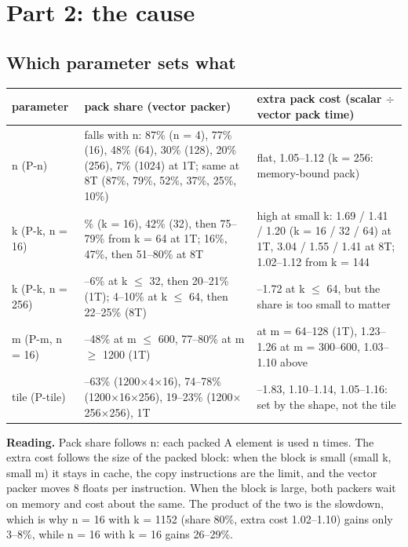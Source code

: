\documentclass[10pt,a4paper]{article}
\begin{document}
\section*{Part 2: the cause}
\subsection*{Which parameter sets what}
\begin{tabularx}{\textwidth}{@{}l >{\raggedright\arraybackslash}X >{\raggedright\arraybackslash}X@{}}
\toprule
parameter & pack share (vector packer) & extra pack cost (scalar $\div$ vector pack time) \\
\midrule
n (P-n) & falls with n: 87\% (n = 4), 77\% (16), 48\% (64), 30\% (128), 20\% (256), 7\% (1024) at 1T; same at 8T (87\%, 79\%, 52\%, 37\%, 25\%, 10\%) & flat, 1.05--1.12 (k = 256: memory-bound pack) \\
k (P-k, n = 16) & 31\% (k = 16), 42\% (32), then 75--79\% from k = 64 at 1T; 16\%, 47\%, then 51--80\% at 8T & high at small k: 1.69 / 1.41 / 1.20 (k = 16 / 32 / 64) at 1T, 3.04 / 1.55 / 1.41 at 8T; 1.02--1.12 from k = 144 \\
k (P-k, n = 256) & 3--6\% at k $\le$ 32, then 20--21\% (1T); 4--10\% at k $\le$ 64, then 22--25\% (8T) & 1.15--1.72 at k $\le$ 64, but the share is too small to matter \\
m (P-m, n = 16) & 32--48\% at m $\le$ 600, 77--80\% at m $\ge$ 1200 (1T) & 1.9 at m = 64--128 (1T), 1.23--1.26 at m = 300--600, 1.03--1.10 above \\
tile (P-tile) & 36--63\% (1200$\times$4$\times$16), 74--78\% (1200$\times$16$\times$256), 19--23\% (1200$\times$256$\times$256), 1T & 1.63--1.83, 1.10--1.14, 1.05--1.16: set by the shape, not the tile \\
\bottomrule
\end{tabularx}

\medskip\noindent\textbf{Reading.} Pack share follows n: each packed A element is used n times. The extra cost follows
the size of the packed block: when the block is small (small k, small m) it stays in cache, the copy instructions are
the limit, and the vector packer moves 8 floats per instruction. When the block is large, both packers wait on memory
and cost about the same. The product of the two is the slowdown, which is why n = 16 with k = 1152 (share 80\%, extra cost 1.02--1.10) gains only 3--8\%, while n = 16 with k = 16 gains 26--29\%.
\end{document}
